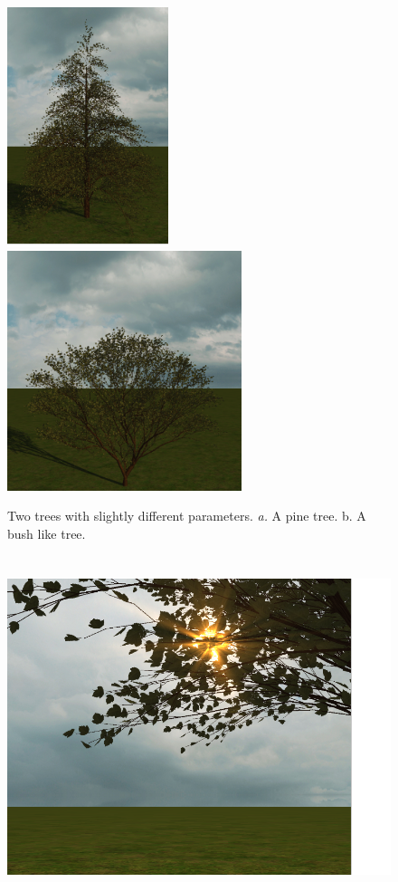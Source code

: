 \documentclass{article}
\begin{document}
  		\begin{figure}[h!]
  			\centering
 			\includegraphics[height=7cm]{pine} 
 			\includegraphics[height=7cm]{bush}
 			
  			\caption{Two trees with slightly different parameters. \textit{a.} A pine tree. b. A bush like tree.}
  			\label{fig:pinebush}
  		\end{figure}
  	
  		\begin{figure}[h!]
  			\centering
  			\includegraphics[height=10cm]{godrays}
  			\caption{}
  			\label{fig:godrays}
  		\end{figure}
  	
\end{document}
